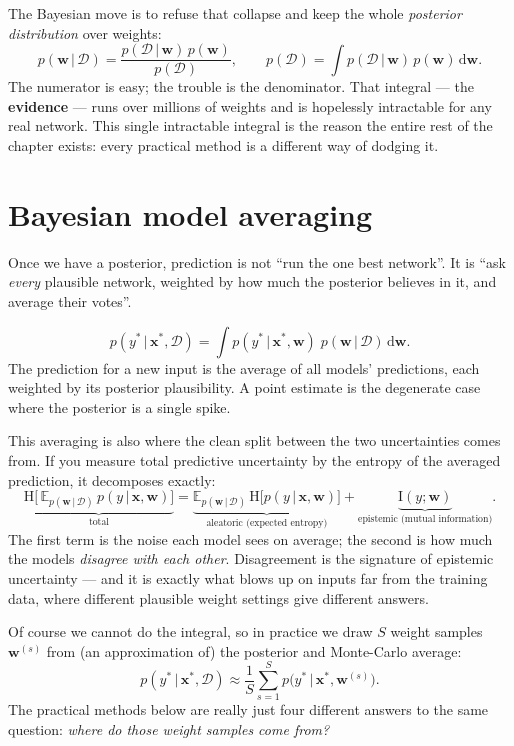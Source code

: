 \documentclass[11pt, oneside]{book}
\newcommand{\E}{\mathbb{E}}              %
\newcommand{\Ent}{\mathrm{H}}
\newcommand{\MI}{\mathrm{I}}
\newcommand{\dd}{\,\mathrm{d}}
\newcommand{\dataset}{\mathcal{D}}
\newcommand{\weights}{\mathbf{w}}
\newcommand{\xvec}{\mathbf{x}}
\newcommand{\given}{\,\vert\,}
\begin{document}
The Bayesian move is to refuse that collapse and keep the whole \emph{posterior
distribution} over weights:
\[
  p(\weights\given\dataset)
  = \frac{p(\dataset\given\weights)\,p(\weights)}{p(\dataset)},
  \qquad
  p(\dataset) = \int p(\dataset\given\weights)\,p(\weights)\dd\weights .
\]
The numerator is easy; the trouble is the denominator. That integral --- the
\textbf{evidence} --- runs over millions of weights and is hopelessly intractable
for any real network. This single intractable integral is the reason the entire
rest of the chapter exists: every practical method is a different way of dodging
it.

\section{Bayesian model averaging}

Once we have a posterior, prediction is not ``run the one best network''. It is
``ask \emph{every} plausible network, weighted by how much the posterior believes
in it, and average their votes''.

\begin{thmbox}[title={Posterior predictive (Bayesian model averaging)}]
\[
  p(y^\ast \given \xvec^\ast, \dataset)
  = \int p(y^\ast \given \xvec^\ast, \weights)\;
         p(\weights \given \dataset)\dd\weights .
\]
The prediction for a new input is the average of all models'
predictions, each weighted by its posterior plausibility. A point estimate is the
degenerate case where the posterior is a single spike.
\end{thmbox}

This averaging is also where the clean split between the two uncertainties comes
from. If you measure total predictive uncertainty by the entropy of the averaged
prediction, it decomposes exactly:
\[
  \underbrace{\Ent\!\bigl[\,\E_{p(\weights\given\dataset)}\,p(y\given\xvec,\weights)\bigr]}_{\text{total}}
  =
  \underbrace{\E_{p(\weights\given\dataset)}\,\Ent\!\bigl[p(y\given\xvec,\weights)\bigr]}_{\text{aleatoric (expected entropy)}}
  +
  \underbrace{\MI(y;\weights)}_{\text{epistemic (mutual information)}} .
\]
The first term is the noise each model sees on average; the second is how much the
models \emph{disagree with each other}. Disagreement is the signature of epistemic
uncertainty --- and it is exactly what blows up on inputs far from the training
data, where different plausible weight settings give different answers.

Of course we cannot do the integral, so in practice we draw $S$ weight samples
$\weights^{(s)}$ from (an approximation of) the posterior and Monte-Carlo average:
\[
  p(y^\ast\given\xvec^\ast,\dataset)
  \approx \frac{1}{S}\sum_{s=1}^{S} p\bigl(y^\ast\given\xvec^\ast,\weights^{(s)}\bigr).
\]
The practical methods below are really just four different answers to the same
question: \emph{where do those weight samples come from?}
\end{document}
